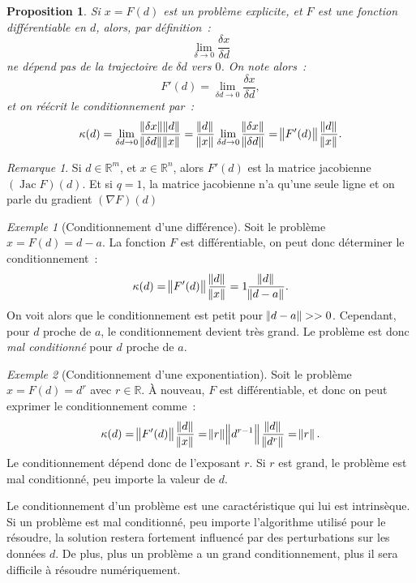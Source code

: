 \documentclass{article}
\newtheorem{prp}[thm]{Proposition}
\theoremstyle{definition}
\theoremstyle{remark}
\newtheorem*{rmq}{Remarque}
\newtheorem{ex}{Exemple}
\DeclareMathOperator{\Jac}{Jac}  %
\newcommand{\R}{\mathbb R}
\begin{document}
	\begin{prp} Si $x = F(d)$ est un problème explicite, et $F$ est une fonction différentiable en $d$, alors, par définition~:
	\[\lim_{\delta \to 0}\frac {\delta x}{\delta d}\]
	ne dépend pas de la trajectoire de $\delta d$ vers $0$. On note alors~:
	\[F'(d) = \lim_{\delta d \to 0}\frac {\delta x}{\delta d},\]
	et on réécrit le conditionnement par~:
	\[\kappa(d) = \lim_{\delta d \to 0}\frac {\norm {\delta x}\norm d}{\norm {\delta d}\norm x}
	= \frac {\norm d}{\norm x}\lim_{\delta d \to 0}\frac {\norm {\delta x}}{\norm {\delta d}} = \norm {F'(d)}\frac {\norm  d}{\norm x}.\]
	\end{prp}

	\begin{rmq} Si $d \in \R^m$, et $x \in \R^n$, alors $F'(d)$ est la matrice jacobienne $(\Jac F)(d)$. Et si $q = 1$, la matrice jacobienne n'a qu'une seule
	ligne et on parle du gradient $(\nabla F)(d)$
	\end{rmq}

	\begin{ex}[Conditionnement d'une différence] Soit le problème $x = F(d) = d-a$. La fonction $F$ est différentiable, on peut donc déterminer le
	conditionnement~:
	\[\kappa(d) = \norm {F'(d)}\frac {\norm d}{\norm x} = 1\frac {\norm d}{\norm {d-a}}.\]
	On voit alors que le conditionnement est petit pour $\norm {d-a} >> 0$. Cependant, pour $d$ proche de $a$, le conditionnement devient très grand.
	Le problème est donc \emph{mal conditionné} pour $d$ proche de $a$.
	\end{ex}

	\begin{ex}[Conditionnement d'une exponentiation] Soit le problème $x = F(d) = d^r$ avec $r \in \R$. À nouveau, $F$ est différentiable, et donc on peut
	exprimer le conditionnement comme~:
	\[\kappa(d) = \norm {F'(d)}\frac {\norm d}{\norm x} = \norm r\norm {d^{r-1}}\frac {\norm d}{\norm {d^r}} = \norm r.\]
	Le conditionnement dépend donc de l'exposant $r$. Si $r$ est grand, le problème est mal conditionné, peu importe la valeur de $d$.
	\end{ex}

	Le conditionnement d'un problème est une caractéristique qui lui est intrinsèque. Si un problème est mal conditionné, peu importe l'algorithme utilisé pour
	le résoudre, la solution restera fortement influencé par des perturbations sur les données $d$. De plus, plus un problème a un grand conditionnement, plus
	il sera difficile à résoudre numériquement.
\end{document}
